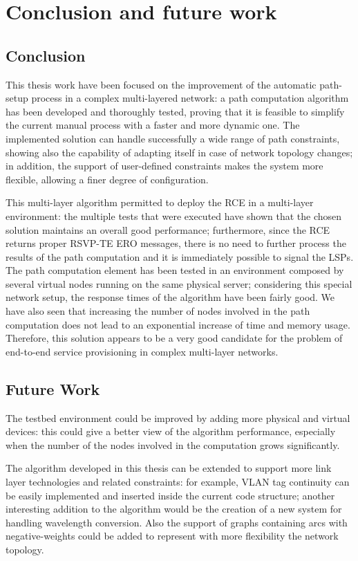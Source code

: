 \documentclass[10pt,a4paper]{report}
\begin{document}
\chapter{Conclusion and future work}\label{sec:conclusion}

\section{Conclusion}

This thesis work have been focused on the improvement of the automatic
path-setup process in a complex multi-layered network: a path
computation algorithm has been developed and thoroughly tested,
proving that it is feasible to simplify the current manual process
with a faster and more dynamic one. The implemented solution can
handle successfully a wide range of path constraints, showing also the
capability of adapting itself in case of network topology changes; in
addition, the support of user-defined constraints makes the system
more flexible, allowing a finer degree of configuration.

This multi-layer algorithm permitted to deploy the RCE in a
multi-layer environment: the multiple tests that were executed have
shown that the chosen solution maintains an overall good performance;
furthermore, since the RCE returns proper RSVP-TE ERO messages, there
is no need to further process the results of the path computation and
it is immediately possible to signal the LSPs. The path computation
element has been tested in an environment composed by several virtual
nodes running on the same physical server; considering this special
network setup, the response times of the algorithm have been fairly
good. We have also seen that increasing the number of nodes involved
in the path computation does not lead to an exponential increase of
time and memory usage. Therefore, this solution appears to be a very
good candidate for the problem of end-to-end service provisioning in
complex multi-layer networks.

\section{Future Work}

The testbed environment could be improved by adding more physical and
virtual devices: this could give a better view of the algorithm
performance, especially when the number of the nodes involved in the
computation grows significantly.

The algorithm developed in this thesis can be extended to support more
link layer technologies and related constraints: for example, VLAN tag
continuity can be easily implemented and inserted inside the current
code structure; another interesting addition to the algorithm would be
the creation of a new system for handling wavelength conversion. Also
the support of graphs containing arcs with negative-weights could be
added to represent with more flexibility the network topology. 
\end{document}
